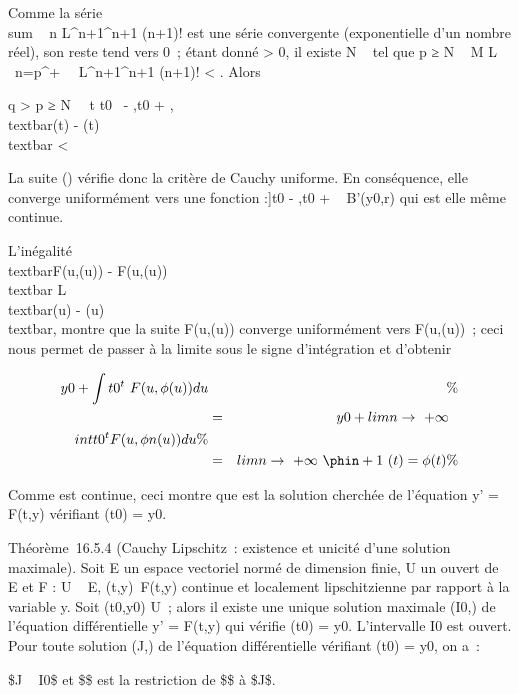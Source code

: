 Comme la série \\sum ~
n L^n+1\eta^n+1 \over
(n+1)! est une série convergente (exponentielle d'un nombre réel), son
reste tend vers 0~; étant donné \epsilon \textgreater{} 0, il existe N \in {}~ tel
que p ≥ N \rigtharrow~ M \over L \
\sum  n=p^+\infty~~
L^n+1\eta^n+1 \over (n+1)!
\textless{} \epsilon. Alors

q \textgreater{} p ≥ N \rigtharrow~\forall~t \in{]}t0~ -
\eta,t0 + \eta{[}, \\textbar{}\phiq(t) -
\phip(t)\\textbar{} \textless{} \epsilon

La suite (\phin) vérifie donc la critère de Cauchy uniforme. En
conséquence, elle converge uniformément vers une fonction \phi
:{]}t0 - \eta,t0 + \eta{[}\rightarrow~ B'(y0,r) qui est
elle même continue.

L'inégalité \\textbar{}F(u,\phi(u)) -
F(u,\phin(u))\\textbar{} \leq
L\\textbar{}\phi(u) -
\phin(u)\\textbar{}, montre que la suite
F(u,\phin(u)) converge uniformément vers F(u,\phi(u))~; ceci nous
permet de passer à la limite sous le signe d'intégration et d'obtenir

\begin{align*} y0
+\int  t0^t~F(u,\phi(u))
du&& \%& \\ & =& y0
+ limn\rightarrow~+\infty~~\\int
 t0^tF(u,\phi n(u)) du\%&
\\ & =&
limn\rightarrow~+\infty~\phin+1~(t) = \phi(t) \%&
\\ \end{align*}

Comme \phi est continue, ceci montre que \phi est la solution cherchée de
l'équation y' = F(t,y) vérifiant \phi(t0) = y0.

Théorème~16.5.4 (Cauchy Lipschitz~: existence et unicité d'une solution
maximale). Soit E un espace vectoriel normé de dimension finie, U un
ouvert de \mathbb{R}~ \times E et F : U \rightarrow~ E, (t,y)\mapsto~F(t,y)
continue et localement lipschitzienne par rapport à la variable y. Soit
(t0,y0) \in U~; alors il existe une unique solution
maximale (I0,) de l'équation différentielle y' =
F(t,y) qui vérifie \phi0(t0) = y0.
L'intervalle I0 est ouvert. Pour toute solution (J,\psi) de
l'équation différentielle vérifiant \psi(t0) = y0, on
a~:

\text\$J \subset~ I0\$ et \$\psi\$ est la restriction
de \$\$ à \$J\$.

